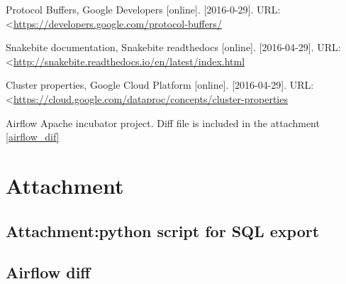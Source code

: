 \documentclass[a4paper,12pt,oneside]{report}
\renewcommand*\thesection{\arabic{section}}
\begin{document}
\begin{thebibliography}{99}
Protocol Buffers, Google Developers [online]. [2016-0-29]. 
URL: \textless\url{https://developers.google.com/protocol-buffers/}

Snakebite documentation, Snakebite readthedocs [online]. [2016-04-29]. 
URL: \textless\url{http://snakebite.readthedocs.io/en/latest/index.html}

Cluster properties, Google Cloud Platform [online]. [2016-04-29]. 
URL: \textless\url{https://cloud.google.com/dataproc/concepts/cluster-properties}


Airflow Apache incubator project. Diff file is included in the attachment \ref{airflow_dif}




\end{thebibliography}




\setcounter{footnote}{1}
\newpage

\appendix
\chapter*{Attachment}

\renewcommand\thesection{\Alph{section}}

\section{Attachment:python script for SQL export}
\section{Airflow diff}\label{airflow_diff}
\end{document}
